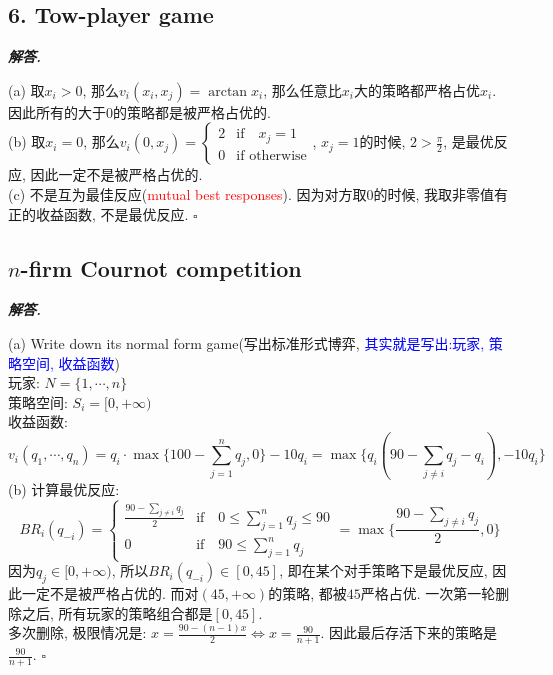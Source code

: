 \documentclass[10pt, a4paper, oneside]{ctexart}
\newenvironment{solution}{%
  \par\noindent\textbf{\textit{解答. }}\ignorespaces
}{%
  \hfill\ensuremath{\square}\par %
}
\begin{document}
\subsection{6. Tow-player game}
\begin{solution}
(a) 取$x_i>0$, 那么$v_i(x_i,x_j)=\arctan x_i$, 那么任意比$x_i$大的策略都严格占优$x_i$. 因此所有的大于$0$的策略都是被严格占优的.\\
(b) 取$x_i=0$, 那么$v_i(0,x_j)=\begin{cases}
    2& \text{if} \quad x_j=1\\
    0 & \text{if otherwise}
\end{cases}$, $x_j=1$的时候, $2>\frac{\pi}{2}$, 是最优反应, 因此一定不是被严格占优的.\\
(c) 不是互为最佳反应(\textcolor{red}{mutual best responses}). 因为对方取$0$的时候, 我取非零值有正的收益函数, 不是最优反应.
\end{solution}

\subsection{$n$-firm Cournot competition}

\begin{solution}
(a) Write down its normal form game(写出标准形式博弈, \textcolor{blue}{其实就是写出:玩家, 策略空间, 收益函数})\\
玩家: $N=\{1,\cdots,n\}$\\
策略空间: $S_i=[0,+\infty)$\\
收益函数: 
$$v_i(q_1,\cdots,q_n)=q_i\cdot\max\{100-\sum_{j=1}^nq_j,0\}-10q_i=\max\{q_i(90-\sum_{j\neq i}q_j -q_i), -10q_i\}$$
(b) 计算最优反应: 
$$BR_i(q_{-i})=\begin{cases}
    \frac{90-\sum_{j\neq i}q_j}{2}&\text{if} \quad 0\leq \sum_{j=1}^n q_j \leq 90\\
    0&\text{if} \quad  90\leq \sum_{j=1}^n q_j 
\end{cases}=\max\{\frac{90-\sum_{j\neq i}q_j}{2},0\}$$
因为$q_j\in [0,+\infty)$, 所以$BR_i(q_{-i})\in [0,45]$, 即在某个对手策略下是最优反应, 因此一定不是被严格占优的. 而对$(45,+\infty)$的策略, 都被$45$严格占优. 一次第一轮删除之后, 所有玩家的策略组合都是$[0,45]$.\\
多次删除, 极限情况是: $x=\frac{90-(n-1)x}{2}\iff x=\frac{90}{n+1}$. 因此最后存活下来的策略是$\frac{90}{n+1}$.
\end{solution}
\end{document}
